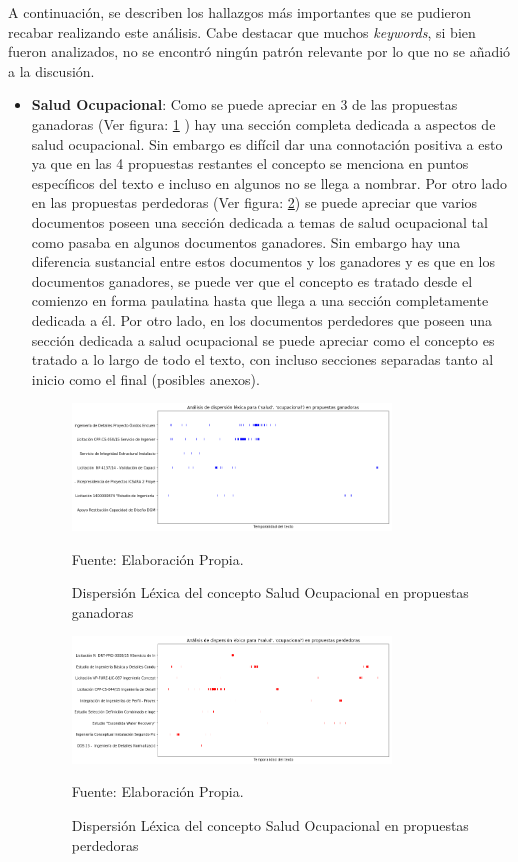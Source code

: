     A continuación, se describen los hallazgos más importantes que se pudieron recabar realizando este análisis. Cabe destacar que muchos \textit{keywords}, si bien fueron analizados, no se encontró ningún patrón relevante por lo que no se añadió a la discusión.
    
    \begin{itemize}
        \item \textbf{Salud Ocupacional}: Como se puede apreciar en 3 de las propuestas ganadoras (Ver figura: \ref{fig:SO_Win} ) hay una sección completa dedicada a aspectos de salud ocupacional. Sin embargo es difícil dar una connotación positiva a esto ya que en las 4 propuestas restantes el concepto se menciona en puntos específicos del texto e incluso en algunos no se llega a nombrar. Por otro lado en las propuestas perdedoras (Ver figura: \ref{fig:SO_Loss}) se puede apreciar que varios documentos poseen una sección dedicada a temas de salud ocupacional tal como pasaba en algunos documentos ganadores. Sin embargo hay una diferencia sustancial entre estos documentos y los ganadores y es que en los documentos ganadores, se puede ver que el concepto es tratado desde el comienzo en forma paulatina hasta que llega a una sección completamente dedicada a él. Por otro lado, en los documentos perdedores que poseen una sección dedicada a salud ocupacional se puede apreciar como el concepto es tratado a lo largo de todo el texto, con incluso secciones separadas tanto al inicio como el final (posibles anexos). 
        
        \begin{figure}[H]
        \centering
        \includegraphics[width=0.8\textwidth]{figures/KeyWords/DispersionPlot_(salud,ocupacional)_blue.png}
        \caption{\label{fig:SO_Win} Dispersión Léxica del concepto Salud Ocupacional en propuestas ganadoras} Fuente: Elaboración Propia.
        \end{figure}
            
        \begin{figure}[H]
        \centering
        \includegraphics[width=0.8\textwidth]{figures/KeyWords/DispersionPlot_(salud,ocupacional)_red.png}
        \caption{\label{fig:SO_Loss} Dispersión Léxica del concepto Salud Ocupacional en propuestas perdedoras} Fuente: Elaboración Propia.
        \end{figure}
        

\end{itemize}
